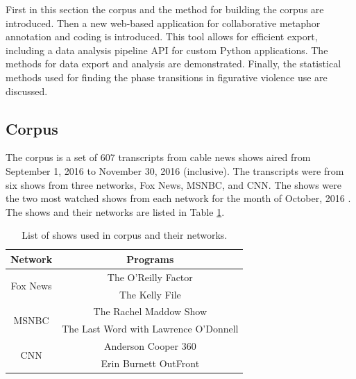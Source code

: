 
First in this section the corpus and the method for building the corpus are introduced. Then
a new web-based application for collaborative metaphor annotation and coding 
is introduced.  This tool allows for efficient export, including a data 
analysis pipeline API for custom Python applications.  
The methods for data export and analysis are demonstrated. Finally, the
statistical methods used for finding the phase transitions in figurative 
violence use are discussed.

\subsection{Corpus}
\label{subsec:Corpus}

The corpus is a set of 607 transcripts from cable news shows aired from
September 1, 2016 to November 30, 2016 (inclusive). The transcripts were from
six shows from three networks, Fox News, MSNBC, and CNN. The shows were the
two most watched shows from each network for the month of
October, 2016 \cite{Katz2016}. The shows and their networks are listed in 
Table \ref{tab:shows}. 

\vspace{.2in}

\begin{table}[!htb]
  \centering
    \begin{tabular}{|c|c|}
      \hline
        Network & Programs \\
      \hline
      \multirow{2}{*}{Fox News} 
        & The O'Reilly Factor \\
        & The Kelly File \\
      \hline
      \multirow{2}{*}{MSNBC}
        & The Rachel Maddow Show \\
        & The Last Word with Lawrence O'Donnell \\
      \hline
      \multirow{2}{*}{CNN}
        & Anderson Cooper 360 \\
        & Erin Burnett OutFront \\
      \hline
    \end{tabular}
  \caption{List of shows used in corpus and their networks.}
  \label{tab:shows}
\end{table}

